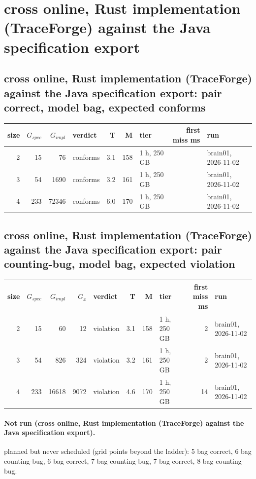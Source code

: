 \documentclass[10pt]{article}
\begin{document}
\section*{cross online, Rust implementation (TraceForge) against the Java specification export}
\subsection*{cross online, Rust implementation (TraceForge) against the Java specification export: pair \textsf{correct}, model bag, expected conforms}
\begin{longtable}{@{}rrrlrrlrl@{}}
\toprule
size & $G_{\mathit{spec}}$ & $G_{\mathit{impl}}$ & verdict & T & M & tier & first miss ms & run \\
\midrule
\endhead
\color{red} 2 & 15 & 76 & conforms & 3.1 & 158 & 1 h, 250 GB &  & brain01, 2026-11-02 \\
\color{red} 3 & 54 & 1690 & conforms & 3.2 & 161 & 1 h, 250 GB &  & brain01, 2026-11-02 \\
\color{red} 4 & 233 & 72346 & conforms & 6.0 & 170 & 1 h, 250 GB &  & brain01, 2026-11-02 \\
\bottomrule
\end{longtable}
\subsection*{cross online, Rust implementation (TraceForge) against the Java specification export: pair \textsf{counting-bug}, model bag, expected violation}
\begin{longtable}{@{}rrrrlrrlrl@{}}
\toprule
size & $G_{\mathit{spec}}$ & $G_{\mathit{impl}}$ & $G_x$ & verdict & T & M & tier & first miss ms & run \\
\midrule
\endhead
\color{red} 2 & 15 & 60 & 12 & violation & 3.1 & 158 & 1 h, 250 GB & 2 & brain01, 2026-11-02 \\
\color{red} 3 & 54 & 826 & 324 & violation & 3.2 & 161 & 1 h, 250 GB & 2 & brain01, 2026-11-02 \\
\color{red} 4 & 233 & 16618 & 9072 & violation & 4.6 & 170 & 1 h, 250 GB & 14 & brain01, 2026-11-02 \\
\bottomrule
\end{longtable}
\paragraph{Not run (cross online, Rust implementation (TraceForge) against the Java specification export).}
planned but never scheduled (grid points beyond the ladder): 5 bag correct, 6 bag counting-bug, 6 bag correct, 7 bag counting-bug, 7 bag correct, 8 bag counting-bug.\par
\end{document}
